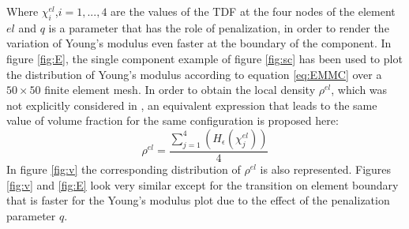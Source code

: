 Where $\chi_i^{el}$,$i=1,...,4$ are the values of the TDF at the four nodes of the element $el$ and $q$ is a parameter that has the role of penalization, in order to render the variation of Young's modulus even faster at the boundary of the component. In figure \ref{fig:E}, the single component example of figure \ref{fig:sc} has been used to plot the distribution of Young's modulus according to equation \eqref{eq:EMMC} over a $50\times50$ finite element mesh. In order to obtain the local density $\rho^{el}$, which was not explicitly considered in \cite{zhang2016new}, an equivalent expression that leads to the same value of volume fraction for the same configuration is proposed here:
\begin{equation}
    \rho^{el}=\frac{\sum_{j=1}^4(H_{\epsilon}(\chi_j^{el}))}{4}
\end{equation}
In figure \ref{fig:v} the corresponding distribution of $\rho^{el}$ is also represented. Figures \ref{fig:v} and \ref{fig:E} look  very similar except for the transition on element boundary that is faster for the Young's modulus plot due to the effect of the penalization parameter $q$.

